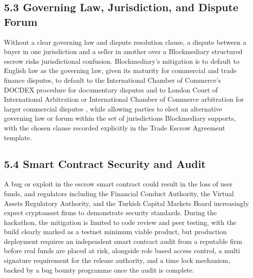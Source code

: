 \documentclass[12pt, a4paper]{article}
\begin{document}
\subsection*{5.3 Governing Law, Jurisdiction, and Dispute Forum}

Without a clear governing law and dispute resolution clause, a dispute between a buyer in
one jurisdiction and a seller in another over a Blockmediary structured escrow risks
jurisdictional confusion. Blockmediary's mitigation is to default to English law as the
governing law, given its maturity for commercial and trade finance disputes, to default to
the International Chamber of Commerce's DOCDEX procedure for documentary disputes and to
London Court of International Arbitration or International Chamber of Commerce
arbitration for larger commercial disputes \citep{iccdocdex}, while allowing parties to
elect an alternative governing law or forum within the set of jurisdictions Blockmediary
supports, with the chosen clause recorded explicitly in the Trade Escrow Agreement
template.

\subsection*{5.4 Smart Contract Security and Audit}

A bug or exploit in the escrow smart contract could result in the loss of user funds, and
regulators including the Financial Conduct Authority, the Virtual Assets Regulatory
Authority, and the Turkish Capital Markets Board increasingly expect cryptoasset firms to
demonstrate security standards. During the hackathon, the mitigation is limited to code
review and peer testing, with the build clearly marked as a testnet minimum viable
product, but production deployment requires an independent smart contract audit from a
reputable firm before real funds are placed at risk, alongside role based access control,
a multi signature requirement for the release authority, and a time lock mechanism, backed
by a bug bounty programme once the audit is complete.
\end{document}
